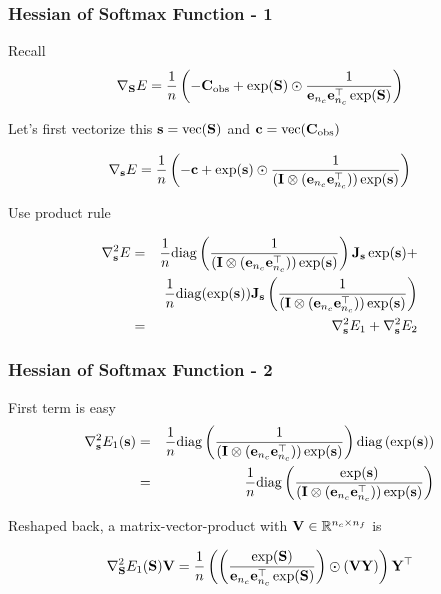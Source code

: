 \documentclass[12pt,fleqn,handout]{beamer}
\begin{document}
\begin{frame}[fragile]\frametitle{Hessian of Softmax Function - 1}

Recall
$$ \nabla_{\bf S} E = \frac{1}{n} \left(-{\bf C}_{\rm obs} + \exp({\bf S})  \odot \frac 1 {{\bf e}_{n_c}{\bf e}_{n_c}^\top\exp({\bf S})} \right) $$

Let's first vectorize this  ${\bf s} = {\rm vec}({\bf S})$ and ${\bf c} = {\rm vec}({\bf C}_{\rm obs})$

$$ \nabla_{\bf s} E = \frac{1}{n} \left(- {\bf c} + \exp({\bf s})  \odot \frac{1 }{({\bf I} \otimes ({\bf e}_{n_c} {\bf e}_{n_c}^{\top}))\exp({\bf s})} \right) $$

\bigskip
\pause

Use product rule

\begin{eqnarray*}
\nabla^2_{\bf s} E &=& \frac{1}{n}{\rm diag} \left( {\frac 1 {({\bf I} \otimes ({\bf e}_{n_c} {\bf e}_{n_c}^{\top})) \exp({\bf s})}} \right)
{\bf J}_{\bf s}  \exp({\bf s})   +  \\
&&
\frac{1}{n}{\rm diag} (\exp ({\bf s})) {\bf J}_{\bf s} \left( {\frac 1 {({\bf I} \otimes ({\bf e}_{n_c} {\bf e}_{n_c}^{\top})) \exp({\bf s})}} \right)\\
&=& \nabla^2_{\bf s} E_1 + \nabla^2_{\bf s} E_2
\end{eqnarray*}
\end{frame}


\begin{frame}[fragile]\frametitle{Hessian of Softmax Function - 2}

First term is easy
\begin{eqnarray*}
\nabla^2_{{\bf s}} E_1({\bf s}) &=& \frac{1}{n}{\rm diag} \left( {\frac 1 {({\bf I}\otimes ({\bf e}_{n_c} {\bf e}_{n_c}^{\top})) \exp({\bf s})}} \right)
{\rm diag} \left( \exp({\bf s})\right) \\
&=&
\frac{1}{n}{\rm diag} \left( {\frac {\exp({\bf s})} {({\bf I} \otimes ({\bf e}_{n_c} {\bf e}_{n_c}^{\top})) \exp({\bf s})}} \right) 
\end{eqnarray*}
\pause
\bigskip


Reshaped back, a matrix-vector-product with ${\bf V} \in \mathbb{R}^{n_c \times n_f}$ is

$$ \nabla^2_{{\bf S}} E_1({\bf S}) {\bf V} = \frac{1}{n}  \left( \left( {\frac {\exp({\bf S})} {{\bf e}_{n_c}{\bf e}_{n_c}^\top \exp({\bf S})}} \right) \odot ( {\bf V} {\bf Y}) \right) {\bf Y}^{\top} $$

\end{frame}
\end{document}
